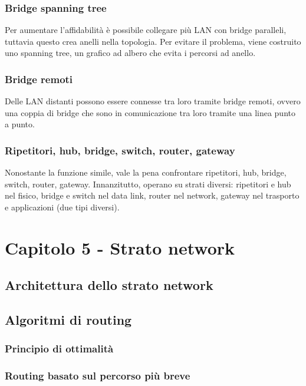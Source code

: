 \subsubsection{Bridge spanning tree}
Per aumentare l'affidabilità è possibile collegare più LAN con bridge paralleli, tuttavia questo crea anelli nella topologia.
Per evitare il problema, viene costruito uno spanning tree, un grafico ad albero che evita i percorsi ad anello.

\subsubsection{Bridge remoti}
Delle LAN distanti possono essere connesse tra loro tramite bridge remoti,
ovvero una coppia di bridge che sono in comunicazione tra loro tramite una linea punto a punto.

\subsubsection{Ripetitori, hub, bridge, switch, router, gateway}
Nonostante la funzione simile, vale la pena confrontare ripetitori, hub, bridge, switch, router, gateway.
Innanzitutto, operano su strati diversi:
ripetitori e hub nel fisico, bridge e switch nel data link, router nel network, gateway nel trasporto e applicazioni (due tipi diversi).

\newpage
\section{Capitolo 5 - Strato network}

\subsection{Architettura dello strato network}

\subsection{Algoritmi di routing} %

\subsubsection{Principio di ottimalità}

\subsubsection{Routing basato sul percorso più breve}

